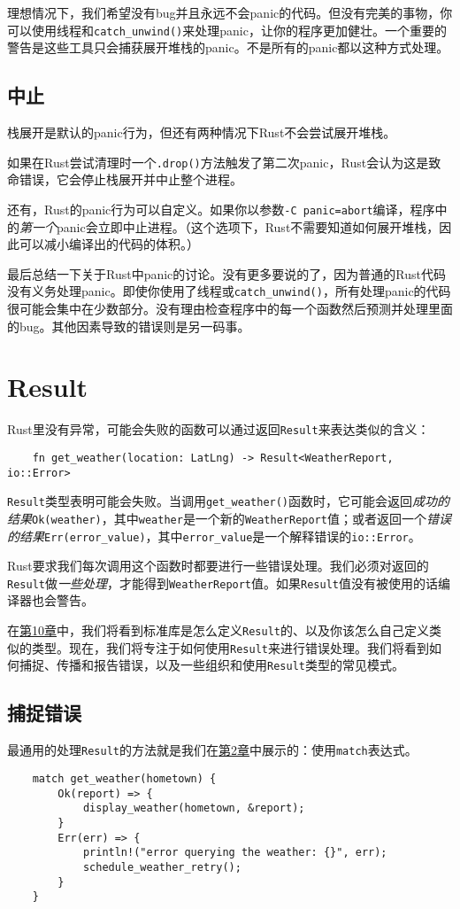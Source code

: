 理想情况下，我们希望没有bug并且永远不会panic的代码。但没有完美的事物，你可以使用线程和\texttt{catch\_unwind()}来处理panic，让你的程序更加健壮。一个重要的警告是这些工具只会捕获展开堆栈的panic。不是所有的panic都以这种方式处理。

\subsection{中止}
栈展开是默认的panic行为，但还有两种情况下Rust不会尝试展开堆栈。

如果在Rust尝试清理时一个\texttt{.drop()}方法触发了第二次panic，Rust会认为这是致命错误，它会停止栈展开并中止整个进程。

还有，Rust的panic行为可以自定义。如果你以参数\texttt{-C panic=abort}编译，程序中的\emph{第一个}panic会立即中止进程。（这个选项下，Rust不需要知道如何展开堆栈，因此可以减小编译出的代码的体积。）

最后总结一下关于Rust中panic的讨论。没有更多要说的了，因为普通的Rust代码没有义务处理panic。即使你使用了线程或\texttt{catch\_unwind()}，所有处理panic的代码很可能会集中在少数部分。没有理由检查程序中的每一个函数然后预测并处理里面的bug。其他因素导致的错误则是另一码事。

\section{Result}

Rust里没有异常，可能会失败的函数可以通过返回\texttt{Result}来表达类似的含义：
\begin{verbatim}
    fn get_weather(location: LatLng) -> Result<WeatherReport, io::Error>
\end{verbatim}
\texttt{Result}类型表明可能会失败。当调用\texttt{get\_weather()}函数时，它可能会返回\emph{成功的结果}\texttt{Ok(weather)}，其中\texttt{weather}是一个新的\texttt{WeatherReport}值；或者返回一个\emph{错误的结果}\texttt{Err(error\_value)}，其中\texttt{error\_value}是一个解释错误的\texttt{io::Error}。

Rust要求我们每次调用这个函数时都要进行一些错误处理。我们必须对返回的\texttt{Result}做\emph{一些处理}，才能得到\texttt{WeatherReport}值。如果\texttt{Result}值没有被使用的话编译器也会警告。

在\hyperref[ch10]{第10章}中，我们将看到标准库是怎么定义\texttt{Result}的、以及你该怎么自己定义类似的类型。现在，我们将专注于如何使用\texttt{Result}来进行错误处理。我们将看到如何捕捉、传播和报告错误，以及一些组织和使用\texttt{Result}类型的常见模式。

\subsection{捕捉错误}
最通用的处理\texttt{Result}的方法就是我们在\hyperref[ch02]{第2章}中展示的：使用\texttt{match}表达式。
\begin{verbatim}
    match get_weather(hometown) {
        Ok(report) => {
            display_weather(hometown, &report);
        }
        Err(err) => {
            println!("error querying the weather: {}", err);
            schedule_weather_retry();
        }
    }
\end{verbatim}

